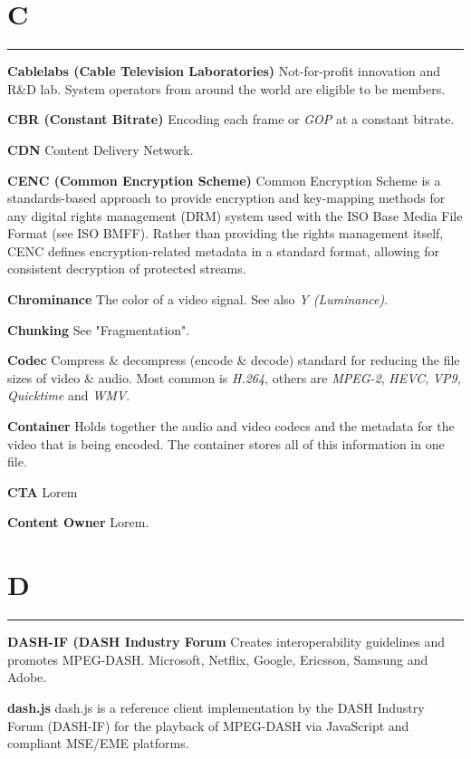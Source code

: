 \section{C}
\hrule

\smallskip
\textbf{Cablelabs (Cable Television Laboratories)}
Not-for-profit innovation and R\&D lab. System operators from around the world are eligible to be members.

\smallskip
\textbf{CBR (Constant Bitrate)}
Encoding each frame or \textit{GOP} at a constant bitrate.

\smallskip
\textbf{CDN}
Content Delivery Network.

\smallskip
\textbf{CENC (Common Encryption Scheme)}
Common Encryption Scheme is a standards-based approach to provide encryption and key-mapping methods for any digital rights management (DRM) system used with the ISO Base Media File Format (see ISO BMFF). Rather than providing the rights management itself, CENC defines encryption-related metadata in a standard format, allowing for consistent decryption of protected streams.

\smallskip
\textbf{Chrominance}
The color of a video signal. See also \textit{Y (Luminance)}.

\smallskip
\textbf{Chunking}
See "Fragmentation".

\smallskip
\textbf{Codec}
Compress \& decompress (encode \& decode) standard for reducing the file sizes of video \& audio. Most common is \textit{H.264}, others are \textit{MPEG-2}, \textit{HEVC}, \textit{VP9}, \textit{Quicktime} and \textit{WMV}.

\smallskip
\textbf{Container}
Holds together the audio and video codecs and the metadata for the video that is being encoded. The container stores all of this information in one file.

\smallskip
\textbf{CTA}
Lorem

\smallskip
\textbf{Content Owner}
Lorem.

\section{D}
\hrule

\smallskip
\textbf{DASH-IF (DASH Industry Forum}
Creates interoperability guidelines and promotes MPEG-DASH. Microsoft, Netflix, Google, Ericsson, Samsung and Adobe.

\smallskip
\textbf{dash.js}
dash.js is a reference client implementation by the DASH Industry Forum (DASH-IF) for the playback of MPEG-DASH via JavaScript and compliant MSE/EME platforms.

